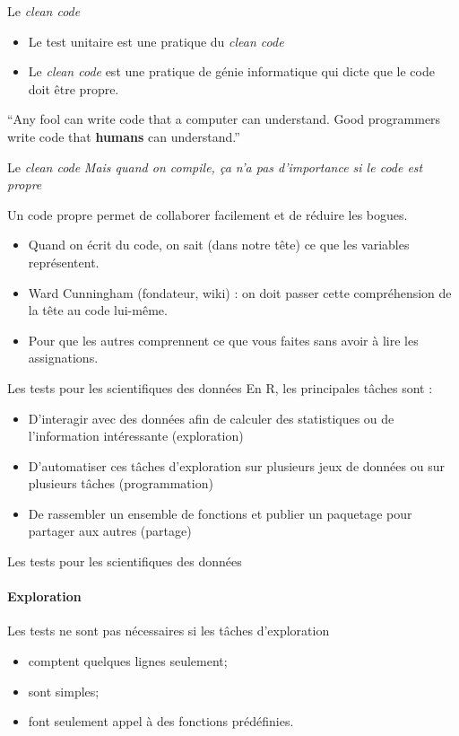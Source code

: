 \documentclass[11pt]{beamer}
\begin{document}
\begin{frame}{Le \textit{clean code}}
\begin{itemize}
    \item Le test unitaire est une pratique du \textit{clean code}
    \item Le \textit{clean code} est une pratique de génie informatique qui dicte que le code doit être propre.
\end{itemize}
\begin{block}{}
{\large ``Any fool can write code that a computer can understand. Good programmers
write code that \textbf{humans} can understand.''}
\vskip5mm
\hspace*{}
\end{block}
\end{frame}

\begin{frame}{Le \textit{clean code}}
\textit{Mais quand on compile, ça n'a pas d'importance si le code est propre}

Un code propre permet de collaborer facilement et de réduire les bogues.
\begin{itemize}
    \item Quand on écrit du code, on sait (dans notre tête) ce que les variables représentent.
    \item Ward Cunningham (fondateur, wiki) : on doit passer cette compréhension de la tête au code lui-même.
    \item Pour que les autres comprennent ce que vous faites sans avoir à lire les assignations.
\end{itemize}
\end{frame}

\begin{frame}{Les tests pour les scientifiques des données}
En \textsf{R}, les principales tâches sont :
\begin{itemize}
\item D'interagir avec des données afin de calculer des statistiques ou de l'information intéressante (exploration)
\item D'automatiser ces tâches d'exploration sur plusieurs jeux de données ou sur plusieurs tâches (programmation)
\item De rassembler un ensemble de fonctions et publier un paquetage pour partager aux autres (partage)
\end{itemize}
\end{frame}

\begin{frame}{Les tests pour les scientifiques des données}
\framesubtitle{Exploration}
Les tests ne sont pas nécessaires si les tâches d'exploration
\begin{itemize}
	\item comptent quelques lignes seulement;
	\item sont simples;
	\item font seulement appel à des fonctions prédéfinies.
\end{itemize}
\end{frame}
\end{document}
